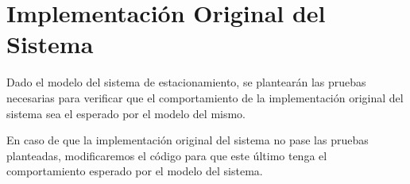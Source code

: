 \documentclass[11pt,letterpaper]{article}
\begin{document}
\setcounter{page}{2}

\hypersetup{pageanchor=true}

\fi



\renewcommand{\contentsname}{Índice}

\renewcommand{\tablename}{Tabla}

\renewcommand{\figurename}{Figura}

\renewcommand{\refname}{Bibliografía}



\tableofcontents

\clearpage
\section{Implementación Original del Sistema}
\label{sec:orgac4ccff}

Dado el modelo del sistema de estacionamiento, se plantearán las pruebas necesarias para verificar que el comportamiento de la implementación original del sistema sea el esperado por el modelo del mismo.

\vspace{\baselineskip}

En caso de que la implementación original del sistema no pase las pruebas planteadas, modificaremos el código para que este último tenga el comportamiento esperado por el modelo del sistema.

\vspace{\baselineskip}
\end{document}
